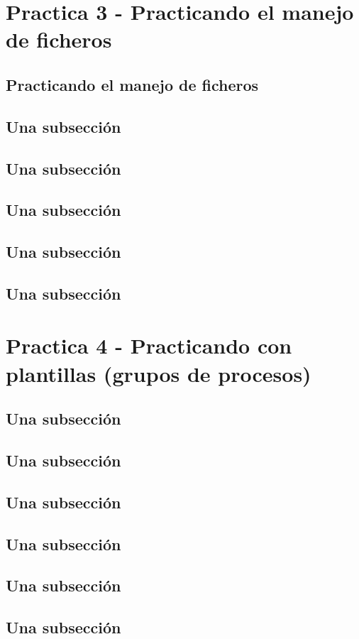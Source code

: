 \documentclass[12pt,a4paper]{article}
\begin{document}
\section{Practica 3 - Practicando el manejo de ficheros}
\subsection{Practicando el manejo de ficheros}
\subsection{Una subsección}
\subsection{Una subsección}
\subsection{Una subsección}
\subsection{Una subsección}
\subsection{Una subsección}
\section{Practica 4 - Practicando con plantillas (grupos de procesos)}
\subsection{Una subsección}
\subsection{Una subsección}
\subsection{Una subsección}
\subsection{Una subsección}
\subsection{Una subsección}
\subsection{Una subsección}
\end{document}
